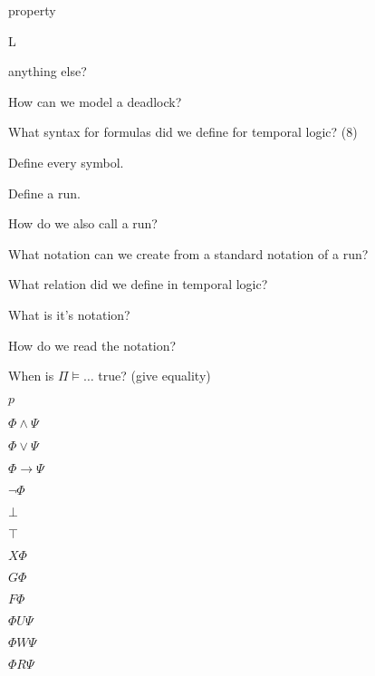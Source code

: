 \documentclass[fleqn]{article}
\begin{document}
\begin{enumerate}
\begin{itemize}
        {\color{red}\item property}
        {\color{red}\item L}
        {\color{red}\item anything else?}
    \end{itemize}
    {\color{red}\item How can we model a deadlock?}
    {\color{red}\item What syntax for formulas did we define for temporal logic? (8)}
    {\color{red}\item Define every symbol.}
    {\color{red}\item Define a run.}
    \item How do we also call a run?
    \item What notation can we create from a standard notation of a run?
    {\color{red}\item What relation did we define in temporal logic?}
    {\color{red}\item What is it's notation?}
    {\color{red}\item How do we read the notation?}
    \item When is $\Pi \models \dots$ true? (give equality)
    \begin{itemize}
        {\color{red}\item $p$}
        \item $\Phi \wedge \Psi$
        \item $\Phi \vee \Psi$
        \item $\Phi \rightarrow \Psi$
        \item $\neg \Phi$
        \item $\bot$
        \item $\top$
        {\color{red}\item $X \Phi$}
        {\color{red}\item $G \Phi$}
        {\color{red}\item $F \Phi$}
        {\color{red}\item $\Phi U \Psi$}
        {\color{red}\item $\Phi W \Psi$}
        {\color{red}\item $\Phi R \Psi$}
    \end{itemize}
\end{enumerate}
\end{document}
